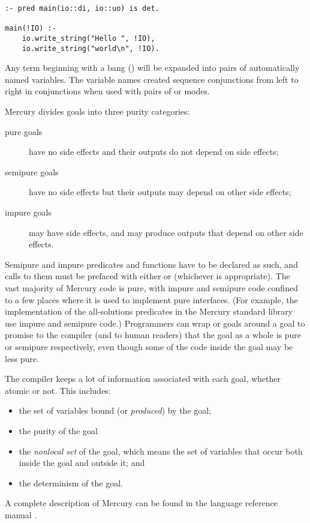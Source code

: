 \begin{verbatim}
:- pred main(io::di, io::uo) is det.

main(!IO) :-
    io.write_string("Hello ", !IO),
    io.write_string("world\n", !IO).
\end{verbatim}

\noindent
Any term beginning with a bang (\code{!})
will be expanded into pairs of automatically named
variables.
The variable names created sequence conjunctions from left to right in
conjunctions when used with pairs of  or 
modes.

\label{page:purity}
Mercury divides goals into three purity categories:

\begin{description}

    \item[pure goals] have no side effects
    and their outputs do not depend on side effects;

    \item[semipure goals] have no side effects
    but their outputs may depend on other side effects;

    \item[impure goals] may have side effects, and may produce outputs
      that depend on other side effects.

\end{description}

\noindent
Semipure and impure predicates and functions
have to be declared as such,
and calls to them must be prefaced with either
 or  (whichever is appropriate).
The vast majority of Mercury code is pure,
with impure and semipure code confined to a few places
where it is used to implement pure interfaces.
(For example, the implementation of the all-solutions predicates
in the Mercury standard library use impure and semipure code.)
Programmers can wrap
 or  goals around a goal
to promise to the compiler (and to human readers) that
the goal as a whole is pure or semipure respectively,
even though some of the code inside the goal may be less pure.

The compiler keeps a lot of information associated with each goal,
whether atomic or not.
This includes:

\begin{itemize}
\item
the set of variables bound (or \emph{produced}) by the goal;
\item
the purity of the goal
\item
the \emph{nonlocal set} of the goal,
which means the set of variables
that occur both inside the goal and outside it; and
\item
the determinism of the goal.
\end{itemize}

\noindent
A complete description of Mercury
can be found in the language reference manual \citep{mercury_refman}.

